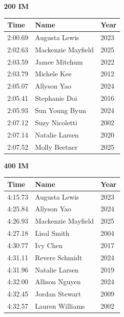 \vspace{1.2em}
\noindent\begin{minipage}[t]{0.48\textwidth}
\centering
\textbf{\textcolor{teamprimary}{200 IM}}\par
\vspace{0.5em}
\centering
\small
\renewcommand{\arraystretch}{1.0}
\setlength{\tabcolsep}{4pt}
\begin{tabular}{@{}p{1.8cm}p{3.0cm}p{1.0cm}@{}}
\toprule
\textbf{Time} & \textbf{Name} & \textbf{Year} \\
\midrule
2:00.69 & Augusta Lewis & 2023 \\
2:02.63 & Mackenzie Mayfield & 2025 \\
2:03.59 & Jamee Mitchum & 2022 \\
2:03.79 & Michele Kee & 2012 \\
2:05.07 & Allyson Yao & 2024 \\
2:05.41 & Stephanie Doi & 2016 \\
2:05.93 & Sun Young Byun & 2024 \\
2:07.12 & Suzy Nicoletti & 2002 \\
2:07.14 & Natalie Larsen & 2020 \\
2:07.52 & Molly Beetner & 2025 \\
\bottomrule
\end{tabular}
\end{minipage}
\hfill
\begin{minipage}[t]{0.48\textwidth}
\centering
\textbf{\textcolor{teamprimary}{400 IM}}\par
\vspace{0.5em}
\centering
\small
\renewcommand{\arraystretch}{1.0}
\setlength{\tabcolsep}{4pt}
\begin{tabular}{@{}p{1.8cm}p{3.0cm}p{1.0cm}@{}}
\toprule
\textbf{Time} & \textbf{Name} & \textbf{Year} \\
\midrule
4:15.73 & Augusta Lewis & 2023 \\
4:25.84 & Allyson Yao & 2024 \\
4:26.93 & Mackenzie Mayfield & 2025 \\
4:27.18 & Lisal Smith & 2004 \\
4:30.77 & Ivy Chen & 2017 \\
4:31.11 & Revere Schmidt & 2024 \\
4:31.96 & Natalie Larsen & 2019 \\
4:32.00 & Allison Nguyen & 2024 \\
4:32.45 & Jordan Stewart & 2009 \\
4:32.57 & Lauren Williams & 2002 \\
\bottomrule
\end{tabular}
\end{minipage}
